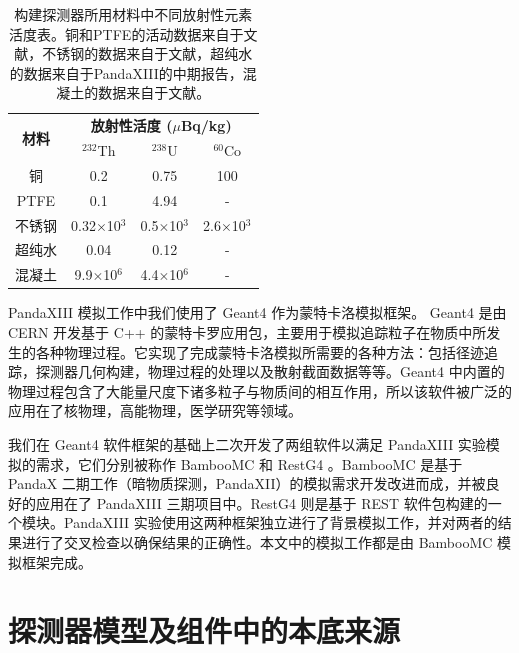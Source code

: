 \renewcommand\arraystretch{1.4}
\begin{table}[tbh]
    \centering
    \caption{构建探测器所用材料中不同放射性元素活度表。铜和PTFE的活动数据来自于文献\cite{Abgrall:2016cct}，不锈钢的数据来自于文献\cite{LZ_CDR}，超纯水的数据来自于PandaXIII的中期报告\cite{cdr}，混凝土的数据来自于文献\cite{Zeng2014}。}
    \begin{tabular*}{0.75\textwidth}{@{\extracolsep{\fill}}cccc}
        \hline
        \hline
        \multirow{2}{*}{\textbf{材料}} & \multicolumn{3}{c}{\textbf{放射性活度 ($\mu$Bq/kg)}}\\
            & $^{232}$Th & $^{238}$U  & $^{60}$Co \\ \hline
        铜      & 0.2        &   0.75     &     100     \\
        PTFE    & 0.1        &   4.94      &    -      \\
        不锈钢  & 0.32$\times$10$^3$          &    0.5$\times$10$^3$      &     2.6$\times$10$^3$     \\
        超纯水  & 0.04          &     0.12      &     -     \\
        混凝土  & 9.9$\times$10$^6$          &    4.4$\times$10$^6$   &    -    \\
        \hline
        \hline
    \end{tabular*}
    \label{tab:activities}
\end{table}
  

PandaXIII 模拟工作中我们使用了 Geant4 作为蒙特卡洛模拟框架。 Geant4 是由 CERN 开发基于 C++ 的蒙特卡罗应用包，主要用于模拟追踪粒子在物质中所发生的各种物理过程。它实现了完成蒙特卡洛模拟所需要的各种方法：包括径迹追踪，探测器几何构建，物理过程的处理以及散射截面数据等等。Geant4 中内置的物理过程包含了大能量尺度下诸多粒子与物质间的相互作用，所以该软件被广泛的应用在了核物理，高能物理，医学研究等领域。

我们在 Geant4 软件框架的基础上二次开发了两组软件以满足 PandaXIII 实验模拟的需求，它们分别被称作 BambooMC 和 RestG4 。BambooMC 是基于 PandaX 二期工作（暗物质探测，PandaXII）的模拟需求开发改进而成，并被良好的应用在了 PandaXIII 三期项目中。RestG4 则是基于 REST \supercite{tomas2013development} 软件包构建的一个模块。PandaXIII 实验使用这两种框架独立进行了背景模拟工作，并对两者的结果进行了交叉检查以确保结果的正确性。本文中的模拟工作都是由 BambooMC 模拟框架完成。

\section{探测器模型及组件中的本底来源}

